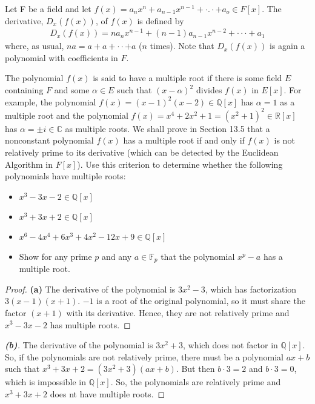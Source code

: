 \documentclass[10pt]{article}
\newenvironment{problem}[2][Problem]{\begin{trivlist}
		\item[\hskip \labelsep {\bfseries #1}\hskip \labelsep {\bfseries #2.}]}{\end{trivlist}}
\begin{document}
	\begin{problem}{19}
		Let F be a field and let $f(x) = a_nx^n + a_{n-1}x^{n-1} + ·.· + a_o \in F[x]$. The derivative, $D_x(f(x))$, of $f(x)$ is defined by
		\begin{align*}
			D_x(f(x)) = na_nx^{n-1} + (n-1)a_{n- 1}x^{n -2} + ··· + a_1
		\end{align*}
		where, as usual, $na = a + a + · · + a$ ($n$ times). Note that $D_x(f(x))$ is again a polynomial with coefficients in $F$. 
		
		The polynomial $f(x)$ is said to have a multiple root if there is some field $E$ containing $F$ and some $\alpha \in E$ such that $(x - \alpha)^2$ divides $f(x)$ in $E[x]$. For example, the polynomial $f(x) = (x - 1)^2(x - 2) \in \mathbb{Q}[x]$ has $\alpha = 1$ as a multiple root and the polynomial $f(x) = x^4 + 2x^2 + 1 = (x^2 + 1 )^2 \in \mathbb{R}[x]$ has $\alpha = \pm i \in \mathbb{C}$ as multiple roots. We shall prove in Section 13.5 that a nonconstant polynomial $f(x)$ has a multiple root if and only if $f(x)$ is not relatively prime to its derivative (which can be detected by the Euclidean Algorithm in $F[x]$). Use this criterion to determine whether the following polynomials have multiple roots:
		\begin{itemize}
			\item[\textbf{(a)}] $x^3 - 3x - 2 \in \mathbb{Q}[x]$
			\item[\textbf{(b)}] $x^3 + 3x + 2 \in \mathbb{Q}[x]$
			\item[\textbf{(c)}] $x^6 - 4x^4 + 6x^3 + 4x^2 - 12x + 9 \in \mathbb{Q}[x]$
			\item[\textbf{(d)}] Show for any prime $p$ and any $a \in \mathbb{F}_p$ that the polynomial $x^p - a$ has a multiple root.
		\end{itemize}
		\begin{proof}{\textbf{(a)}}
			The derivative of the polynomial is $3x^2-3$, which has factorization $3(x-1)(x+1)$. $-1$ is a root of the original polynomial, so it must share the factor $(x+1)$ with its derivative. Hence, they are not relatively prime and $x^3 - 3x - 2$ has multiple roots.
		\end{proof}
		
		\begin{proof}[\textbf{(b)}]
			The derivative of the polynomial is $3x^2 + 3$, which does not factor in $\mathbb{Q}[x]$. So, if the polynomials are not relatively prime, there must be a polynomial $ax+b$ such that $x^3 + 3x + 2 = (3x^2 + 3)(ax+b)$. But then $b\cdot3 = 2$ and $b\cdot3=0$, which is impossible in $\mathbb{Q}[x]$. So, the polynomials are relatively prime and $x^3 + 3x + 2$ does nt have multiple roots.
		\end{proof}
		

\end{problem}
\end{document}
